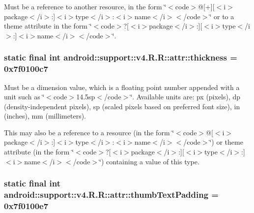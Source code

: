 Must be a reference to another resource, in the form \char`\"{}$<$code$>$@\mbox{[}+\mbox{]}\mbox{[}$<$i$>$package$<$/i$>$:\mbox{]}$<$i$>$type$<$/i$>$:$<$i$>$name$<$/i$>$$<$/code$>$\char`\"{} or to a theme attribute in the form \char`\"{}$<$code$>$?\mbox{[}$<$i$>$package$<$/i$>$:\mbox{]}\mbox{[}$<$i$>$type$<$/i$>$:\mbox{]}$<$i$>$name$<$/i$>$$<$/code$>$\char`\"{}. \hypertarget{classandroid_1_1support_1_1v4_1_1_r_1_1attr_7ba30267b9eee15bc690aca312f22d61}{
\subsubsection[{thickness}]{\setlength{\rightskip}{0pt plus 5cm}static final int android::support::v4.R.R::attr::thickness = 0x7f0100c7}}
\label{classandroid_1_1support_1_1v4_1_1_r_1_1attr_7ba30267b9eee15bc690aca312f22d61}


Must be a dimension value, which is a floating point number appended with a unit such as \char`\"{}$<$code$>$14.5sp$<$/code$>$\char`\"{}. Available units are: px (pixels), dp (density-independent pixels), sp (scaled pixels based on preferred font size), in (inches), mm (millimeters). 

This may also be a reference to a resource (in the form \char`\"{}$<$code$>$@\mbox{[}$<$i$>$package$<$/i$>$:\mbox{]}$<$i$>$type$<$/i$>$:$<$i$>$name$<$/i$>$$<$/code$>$\char`\"{}) or theme attribute (in the form \char`\"{}$<$code$>$?\mbox{[}$<$i$>$package$<$/i$>$:\mbox{]}\mbox{[}$<$i$>$type$<$/i$>$:\mbox{]}$<$i$>$name$<$/i$>$$<$/code$>$\char`\"{}) containing a value of this type. \hypertarget{classandroid_1_1support_1_1v4_1_1_r_1_1attr_916537ade330bf40aec92369791564f2}{
\subsubsection[{thumbTextPadding}]{\setlength{\rightskip}{0pt plus 5cm}static final int android::support::v4.R.R::attr::thumbTextPadding = 0x7f0100e7}}
\label{classandroid_1_1support_1_1v4_1_1_r_1_1attr_916537ade330bf40aec92369791564f2}


